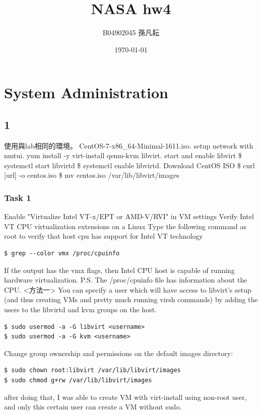 \documentclass{article}
\title{NASA hw4}
\author{B04902045 孫凡耘}
\date{\today}
\begin{document}
\maketitle
    \section{System Administration}
    \subsection{1}
    使用與lab相同的環境。\newline
    CentOS-7-x86\_64-Minimal-1611.iso. setup network with nmtui. yum install -y virt-install qemu-kvm libvirt. start and enable libvirt\newline
    \$ systemctl start libvirtd\newline
    \$ systemctl enable libvirtd. Download CentOS ISO\newline
    \$ curl [url] -o centos.iso\newline
    \$ mv centos.iso /var/lib/libvirt/images\newline
    \subsubsection{Task 1}
Enable "Virtualize Intel VT-x/EPT or AMD-V/RVI" in VM settings
\newline\newline
Verify Intel VT CPU virtualization extensions on a Linux\newline
Type the following command as root to verify that host cpu has support for Intel VT technology
\begin{verbatim}
$ grep --color vmx /proc/cpuinfo
\end{verbatim}
If the output has the vmx flags, then Intel CPU host is capable of running hardware virtualization.\newline
P.S. The /proc/cpuinfo file has information about the CPU.\newline
\newline
<方法一>\newline
You can specify a user which will have access to libvirt's setup (and thus creating VMs and pretty much running virsh commands) by adding the users to the libvirtd and kvm groups on the host.
\begin{verbatim}
$ sudo usermod -a -G libvirt <username>
$ sudo usermod -a -G kvm <username>
\end{verbatim}
Change group ownership and permissions on the default images directory:
\begin{verbatim}
$ sudo chown root:libvirt /var/lib/libvirt/images
$ sudo chmod g+rw /var/lib/libvirt/images
\end{verbatim}
after doing that, I was able to create VM with virt-install using non-root user, and only this certain user can create a VM without sudo.
\newline\newline
\end{document}
